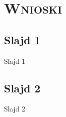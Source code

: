 \section{\scshape Wnioski}

\subsection{Slajd 1}
\begin{frame}{Slajd 1}
\end{frame}

\subsection{Slajd 2}
\begin{frame}{Slajd 2}
\end{frame}